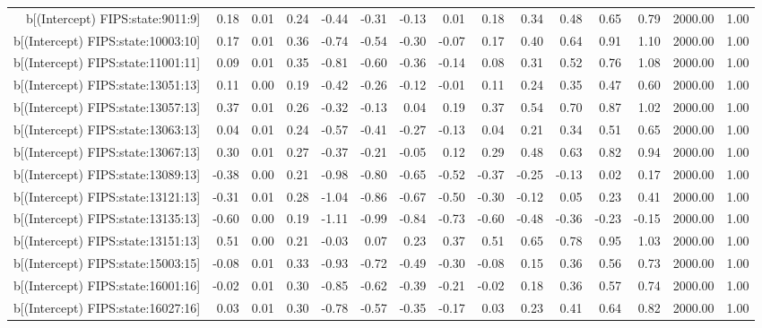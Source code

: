 \begin{table}[ht]
\begin{tabular}{rrrrrrrrrrrrrrr}
  b[(Intercept) FIPS:state:9011:9] & 0.18 & 0.01 & 0.24 & -0.44 & -0.31 & -0.13 & 0.01 & 0.18 & 0.34 & 0.48 & 0.65 & 0.79 & 2000.00 & 1.00 \\ 
  b[(Intercept) FIPS:state:10003:10] & 0.17 & 0.01 & 0.36 & -0.74 & -0.54 & -0.30 & -0.07 & 0.17 & 0.40 & 0.64 & 0.91 & 1.10 & 2000.00 & 1.00 \\ 
  b[(Intercept) FIPS:state:11001:11] & 0.09 & 0.01 & 0.35 & -0.81 & -0.60 & -0.36 & -0.14 & 0.08 & 0.31 & 0.52 & 0.76 & 1.08 & 2000.00 & 1.00 \\ 
  b[(Intercept) FIPS:state:13051:13] & 0.11 & 0.00 & 0.19 & -0.42 & -0.26 & -0.12 & -0.01 & 0.11 & 0.24 & 0.35 & 0.47 & 0.60 & 2000.00 & 1.00 \\ 
  b[(Intercept) FIPS:state:13057:13] & 0.37 & 0.01 & 0.26 & -0.32 & -0.13 & 0.04 & 0.19 & 0.37 & 0.54 & 0.70 & 0.87 & 1.02 & 2000.00 & 1.00 \\ 
  b[(Intercept) FIPS:state:13063:13] & 0.04 & 0.01 & 0.24 & -0.57 & -0.41 & -0.27 & -0.13 & 0.04 & 0.21 & 0.34 & 0.51 & 0.65 & 2000.00 & 1.00 \\ 
  b[(Intercept) FIPS:state:13067:13] & 0.30 & 0.01 & 0.27 & -0.37 & -0.21 & -0.05 & 0.12 & 0.29 & 0.48 & 0.63 & 0.82 & 0.94 & 2000.00 & 1.00 \\ 
  b[(Intercept) FIPS:state:13089:13] & -0.38 & 0.00 & 0.21 & -0.98 & -0.80 & -0.65 & -0.52 & -0.37 & -0.25 & -0.13 & 0.02 & 0.17 & 2000.00 & 1.00 \\ 
  b[(Intercept) FIPS:state:13121:13] & -0.31 & 0.01 & 0.28 & -1.04 & -0.86 & -0.67 & -0.50 & -0.30 & -0.12 & 0.05 & 0.23 & 0.41 & 2000.00 & 1.00 \\ 
  b[(Intercept) FIPS:state:13135:13] & -0.60 & 0.00 & 0.19 & -1.11 & -0.99 & -0.84 & -0.73 & -0.60 & -0.48 & -0.36 & -0.23 & -0.15 & 2000.00 & 1.00 \\ 
  b[(Intercept) FIPS:state:13151:13] & 0.51 & 0.00 & 0.21 & -0.03 & 0.07 & 0.23 & 0.37 & 0.51 & 0.65 & 0.78 & 0.95 & 1.03 & 2000.00 & 1.00 \\ 
  b[(Intercept) FIPS:state:15003:15] & -0.08 & 0.01 & 0.33 & -0.93 & -0.72 & -0.49 & -0.30 & -0.08 & 0.15 & 0.36 & 0.56 & 0.73 & 2000.00 & 1.00 \\ 
  b[(Intercept) FIPS:state:16001:16] & -0.02 & 0.01 & 0.30 & -0.85 & -0.62 & -0.39 & -0.21 & -0.02 & 0.18 & 0.36 & 0.57 & 0.74 & 2000.00 & 1.00 \\ 
  b[(Intercept) FIPS:state:16027:16] & 0.03 & 0.01 & 0.30 & -0.78 & -0.57 & -0.35 & -0.17 & 0.03 & 0.23 & 0.41 & 0.64 & 0.82 & 2000.00 & 1.00 \\ 

\end{tabular}
\end{table}
